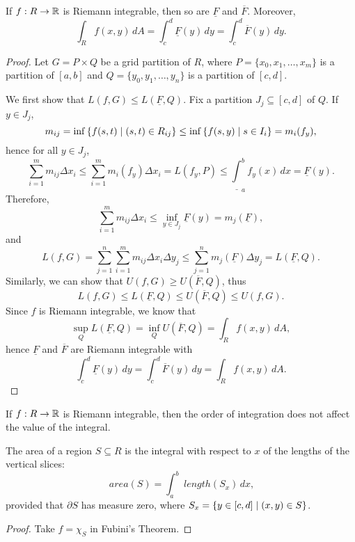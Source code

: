 \begin{thm}
    If $f: R \to {\mathbb R}$ is Riemann integrable, then so are $\underline{F}$ and $\overline{F}$. Moreover,
    \[
    \int_R f(x, y) \, dA = \int_c^d \underline{F}(y) \, dy = \int_c^d \overline{F}(y) \, dy.
    \]
    \begin{proof}
        Let $G = P \times Q$ be a grid partition of $R$, where $P = \{x_0, x_1, \ldots, x_m\}$ is a partition of $[a, b]$ and $Q = \{y_0, y_1, \ldots, y_n\}$ is a partition of $[c, d]$. 

        We first show that $L(f, G) \leq L(\underline{F}, Q)$. Fix a partition $J_j \subseteq [c, d]$ of $Q$. If $y \in J_j$, 
        \[
        m_{ij} = \inf {\left\{{f(s, t) \mid (s, t) \in R_{ij}}\right\}} \leq \inf {\left\{{f(s, y) \mid s \in I_i}\right\}} = m_i(f_y),
        \]
        hence for all $y \in J_j$,
        \[
        \sum_{i=1}^m m_{ij} \Delta x_i \leq \sum_{i=1}^m m_i(f_y) \Delta x_i = L(f_y, P) \leq \underline{\int}_a^b f_y(x) \, dx = \underline{F}(y).
        \]
        Therefore,
        \[
        \sum_{i=1}^m m_{ij} \Delta x_i \leq \inf_{y \in J_j} \underline{F}(y) = m_j(\underline{F}),
        \]
        and
        \[
        L(f, G) = \sum_{j=1}^n \sum_{i=1}^m m_{ij} \Delta x_i \Delta y_j \leq \sum_{j=1}^n m_j(\underline{F}) \Delta y_j = L(\underline{F}, Q).
        \]
        Similarly, we can show that $U(f, G) \geq U(\overline{F}, Q)$, thus
        \[
        L(f, G) \leq L(\underline{F}, Q) \leq U(\overline{F}, Q) \leq U(f, G).
        \]
        Since $f$ is Riemann integrable, we know that
        \[
        \sup_Q L(\underline{F}, Q) = \inf_Q U(\overline{F}, Q) = \int_R f(x, y) \, dA,
        \]
        hence $\underline{F}$ and $\overline{F}$ are Riemann integrable with
        \[
        \int_c^d \underline{F}(y) \, dy = \int_c^d \overline{F}(y) \, dy = \int_R f(x, y) \, dA.
        \]
    \end{proof}
\end{thm}

\begin{cl}
    If $f: R \to {\mathbb R}$ is Riemann integrable, then the order of integration does not affect the value of the integral.
\end{cl}

\begin{cl}
    The area of a region $S \subseteq R$ is the integral with respect to $x$ of the lengths of the vertical slices:
    \[
    ~area (S) = \int_a^b ~length (S_x) \, dx,
    \]
    provided that $\partial S$ has measure zero, where $S_x = {\left\{{y \in [c, d] \mid (x, y) \in S}\right\}}$.
    \begin{proof}
        Take $f = \chi_S$ in Fubini's Theorem.
    \end{proof}
\end{cl}

